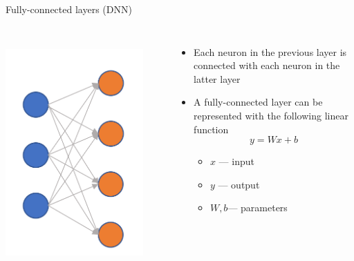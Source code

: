 \documentclass{beamer}
\begin{document}
\begin{CJK*}{UTF8}{gbsn}
\begin{frame}{Fully-connected layers (DNN)}
\begin{columns}
\includegraphics[width=\textwidth]{figures/FC}
\begin{minipage}[c][0.45\textheight][c]{\linewidth} 
\begin{itemize}
\item Each neuron in the previous layer is connected with each neuron in the latter layer 
\item A fully-connected layer can be represented with the following linear function
$$y=Wx+b$$
\begin{itemize}
\item $x$ --- input
\item $y$ --- output
\item $W,b$--- parameters


\end{itemize}
\end{itemize}
\end{minipage}
\end{columns}
\end{frame}
\end{CJK*}
\end{document}
